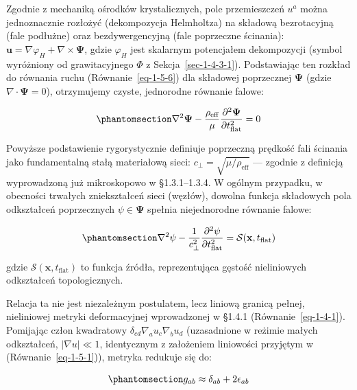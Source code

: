 \documentclass[
  polish,
  letterpaper,
  DIV=11,
  numbers=noendperiod,
  oneside]{scrartcl}
\begin{document}
Zgodnie z mechaniką ośrodków krystalicznych, pole przemieszczeń \(u^a\)
można jednoznacznie rozłożyć (dekompozycja Helmholtza) na składową
bezrotacyjną (fale podłużne) oraz bezdywergencyjną (fale poprzeczne
ścinania):
\(\mathbf{u} = \nabla \varphi_H + \nabla \times \mathbf{\Psi}\), gdzie
\(\varphi_H\) jest skalarnym potencjałem dekompozycji (symbol wyróżniony
od grawitacyjnego \(\Phi\) z Sekcja~\ref{sec-1-4-3-1}). Podstawiając ten
rozkład do równania ruchu (Równanie~\ref{eq-1-5-6}) dla składowej
poprzecznej \(\mathbf{\Psi}\) (gdzie
\(\nabla \cdot \mathbf{\Psi} = 0\)), otrzymujemy czyste, jednorodne
równanie falowe:

\begin{equation}\protect\phantomsection\label{eq-1-5-7}{\nabla^2 \mathbf{\Psi} - \frac{\rho_{\text{eff}}}{\mu} \frac{\partial^2 \mathbf{\Psi}}{\partial t_{\text{flat}}^2} = 0}\end{equation}

Powyższe podstawienie rygorystycznie definiuje poprzeczną prędkość fali
ścinania jako fundamentalną stałą materiałową sieci:
\(c_{\perp} = \sqrt{\mu / \rho_{\text{eff}}}\) --- zgodnie z definicją
wyprowadzoną już mikroskopowo w §1.3.1--1.3.4. W ogólnym przypadku, w
obecności trwałych zniekształceń sieci (węzłów), dowolna funkcja
składowych pola odkształceń poprzecznych \(\psi \in \mathbf{\Psi}\)
spełnia niejednorodne równanie falowe:

\begin{equation}\protect\phantomsection\label{eq-1-5-8}{\nabla^2 \psi - \frac{1}{c_{\perp}^2} \frac{\partial^2 \psi}{\partial t_{\text{flat}}^2} = \mathcal{S}(\mathbf{x}, t_{\text{flat}})}\end{equation}

gdzie \(\mathcal{S}(\mathbf{x}, t_{\text{flat}})\) to funkcja źródła,
reprezentująca gęstość nieliniowych odkształceń topologicznych.

Relacja ta nie jest niezależnym postulatem, lecz liniową granicą pełnej,
nieliniowej metryki deformacyjnej wprowadzonej w §1.4.1
(Równanie~\ref{eq-1-4-1}). Pomijając człon kwadratowy
\(\delta_{cd}\nabla_a u_c\nabla_b u_d\) (uzasadnione w reżimie małych
odkształceń, \(|\nabla u|\ll1\), identycznym z założeniem liniowości
przyjętym w (Równanie~\ref{eq-1-5-1})), metryka redukuje się do:

\begin{equation}\protect\phantomsection\label{eq-1-5-9}{g_{ab} \approx \delta_{ab} + 2\epsilon_{ab}}\end{equation}
\end{document}
